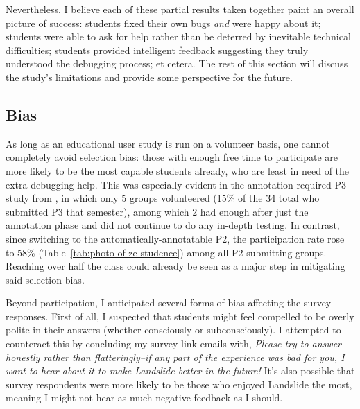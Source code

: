 Nevertheless, I believe each of these partial results taken together
paint an overall picture of success:
students fixed their own bugs {\em and} were happy about it;
students were able to ask for help rather than be deterred by inevitable technical difficulties;
students provided intelligent feedback suggesting they truly understood the debugging process;
et cetera.
%
The rest of this section will discuss the study's limitations and provide some perspective for the future.

\subsection{Bias}


As long as an educational user study is run on a volunteer basis,
one cannot completely avoid selection bias:
those with enough free time to participate are more likely to be the most capable students already,
who are least in need of the extra debugging help.
This was especially evident in the annotation-required P3 study from \cite{landslide},
in which only 5 groups volunteered (15\% of the 34 total who submitted P3 that semester),
among which 2 had enough after just the annotation phase and did not continue to do any in-depth testing.
In contrast, since switching to the automatically-annotatable P2,
the participation rate rose to 58\% (Table~\ref{tab:photo-of-ze-studence})
among all P2-submitting groups.
Reaching over half the class could already be seen as a major step in mitigating said selection bias.

Beyond participation, I anticipated several forms of bias affecting the survey responses.
First of all, I suspected that students might feel compelled to be overly polite in their answers
(whether consciously or subconsciously).
I attempted to counteract this by concluding my survey link emails with,
{\em Please try to answer honestly rather than flatteringly--if any part
of the experience was bad for you, I want to hear about it to make
Landslide better in the future!}
It's also possible that survey respondents %
were more likely to be those who enjoyed Landslide the most,
meaning I might not hear as much negative feedback as I should.

